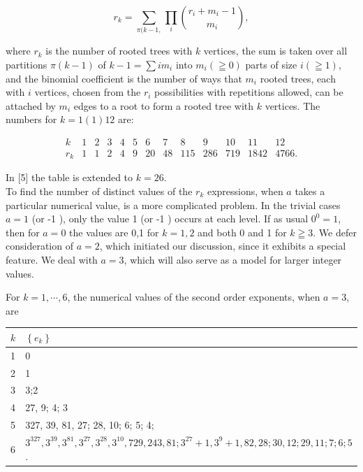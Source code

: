 \documentclass[10pt]{article}
\begin{document}
$$
r_{k}=\sum_{\pi(k-1,} \prod_{i}\binom{r_{i}+m_{i}-1}{m_{i}},
$$

where $r_{k}$ is the number of rooted trees with $k$ vertices, the sum is taken over all partitions $\pi(k-1)$ of $k-1=\sum i m_{i}$ into $m_{i}(\geqq 0)$ parts of size $i(\geqq 1)$, and the binomial coefficient is the number of ways that $m_{i}$ rooted trees, each with $i$ vertices, chosen from the $r_{i}$ possibilities with repetitions allowed, can be attached by $m_{i}$ edges to a root to form a rooted tree with $k$ vertices. The numbers for $k=1(1) 12$ are:

$$
\begin{array}{ccccccccccccc}
k & 1 & 2 & 3 & 4 & 5 & 6 & 7 & 8 & 9 & 10 & 11 & 12 \\
r_{k} & 1 & 1 & 2 & 4 & 9 & 20 & 48 & 115 & 286 & 719 & 1842 & 4766 .
\end{array}
$$

In [5] the table is extended to $k=26$.\\
To find the number of distinct values of the $r_{k}$ expressions, when $a$ takes a particular numerical value, is a more complicated problem. In the trivial cases $a=1$ (or -1 ), only the value 1 (or -1 ) occurs at each level. If as usual $0^{0}=1$, then for $a=0$ the values are 0,1 for $k=1,2$ and both 0 and 1 for $k \geqq 3$. We defer consideration of $a=2$, which initiated our discussion, since it exhibits a special feature. We deal with $a=3$, which will also serve as a model for larger integer values.

For $k=1, \cdots, 6$, the numerical values of the second order exponents, when $a=3$, are

\begin{center}
\begin{tabular}{|l|l|}
\hline
$k$ & $\left\{e_{k}\right\}$ \\
\hline
1 & 0 \\
\hline
2 & 1 \\
\hline
3 & 3;2 \\
\hline
4 & 27, 9; 4; 3 \\
\hline
5 & 327, 39, 81, 27; 28, 10; 6; 5; 4; \\
\hline
6 & $3^{327}, 3^{39}, 3^{81}, 3^{27}, 3^{28}, 3^{10}, 729,243,81 ; 3^{27}+1,3^{9}+1,82,28 ; 30,12 ; 29,11 ; 7 ; 6 ; 5$. \\
\hline
\end{tabular}
\end{center}
\end{document}
